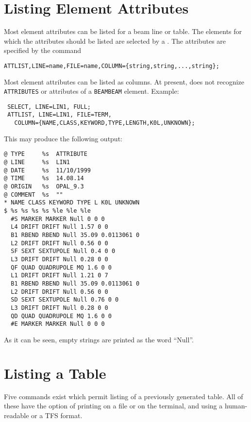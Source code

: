 \section{Listing Element Attributes}
\label{sec:attlist}
Most element attributes can be listed for a beam line or table.
The elements for which the attributes should be listed are selected
by a .
The attributes are specified by the command
\begin{verbatim}
ATTLIST,LINE=name,FILE=name,COLUMN={string,string,...,string};
\end{verbatim}
Most element attributes can be listed as columns.
At present, \opal does not recognize \texttt{ATTRIBUTES} or attributes
of a \texttt{BEAMBEAM} element.
Example:
\begin{verbatim}
 SELECT, LINE=LIN1, FULL;
 ATTLIST, LINE=LIN1, FILE=TERM,
   COLUMN={NAME,CLASS,KEYWORD,TYPE,LENGTH,K0L,UNKNOWN};
\end{verbatim}
This may produce the following output:
\begin{verbatim}
@ TYPE     %s  ATTRIBUTE
@ LINE     %s  LIN1
@ DATE     %s  11/10/1999
@ TIME     %s  14.08.14
@ ORIGIN   %s  OPAL_9.3
@ COMMENT  %s  ""
* NAME CLASS KEYWORD TYPE L K0L UNKNOWN
$ %s %s %s %s %le %le %le
  #S MARKER MARKER Null 0 0 0
  L4 DRIFT DRIFT Null 1.57 0 0
  B1 RBEND RBEND Null 35.09 0.0113061 0
  L2 DRIFT DRIFT Null 0.56 0 0
  SF SEXT SEXTUPOLE Null 0.4 0 0
  L3 DRIFT DRIFT Null 0.28 0 0
  QF QUAD QUADRUPOLE MQ 1.6 0 0
  L1 DRIFT DRIFT Null 1.21 0 7
  B1 RBEND RBEND Null 35.09 0.0113061 0
  L2 DRIFT DRIFT Null 0.56 0 0
  SD SEXT SEXTUPOLE Null 0.76 0 0
  L3 DRIFT DRIFT Null 0.28 0 0
  QD QUAD QUADRUPOLE MQ 1.6 0 0
  #E MARKER MARKER Null 0 0 0
\end{verbatim}
As it can be seen, empty strings are printed as the word ``Null''.
\clearpage
\section{Listing a Table}
\label{sec:list}
Five commands exist which permit listing of a previously generated
table. 
All of these have the option of printing on a file or on the terminal,
and using a human-readable or a TFS format.

